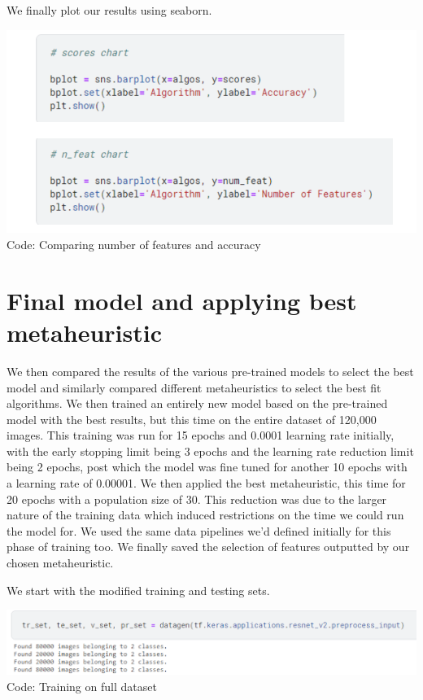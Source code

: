 	 
 
We finally plot our results using seaborn.

\begin{center}
   \includegraphics[width=6in]{images/c9.png} 
   \\\fontsize{11pt}{24pt} Code: Comparing number of features and accuracy
\end{center}

	 
		

\section{Final model and applying best metaheuristic}
We then compared the results of the various pre-trained models to select the best model and similarly compared different metaheuristics to select the best fit algorithms. We then trained an entirely new model based on the pre-trained model with the best results, but this time on the entire dataset of 120,000 images. This training was run for 15 epochs and 0.0001 learning rate initially, with the early stopping limit being 3 epochs and the learning rate reduction limit being 2 epochs, post which the model was fine tuned for another 10 epochs with a learning rate of 0.00001. We then applied the best metaheuristic, this time for 20 epochs with a population size of 30. This reduction was due to the larger nature of the training data which induced restrictions on the time we could run the model for. We used the same data pipelines we’d defined initially for this phase of training too. We finally saved the selection of features outputted by our chosen metaheuristic. 

We start with the modified training and testing sets. 

\begin{center}
   \includegraphics[width=6in]{images/c10.png} 
   \\\fontsize{11pt}{24pt} Code: Training on full dataset
\end{center}

